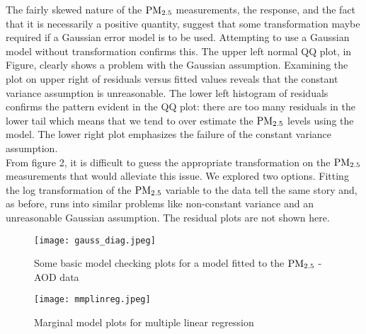 \documentclass[10pt]{article}
\begin{document}
\begin{itemize}
The fairly skewed nature of the ${\mathrm{PM_{2.5}}}$ measurements, the response, and the fact that it is necessarily a positive quantity, suggest that some transformation maybe required if a Gaussian error model is to be used. Attempting to use a Gaussian model without transformation confirms this. The upper left normal QQ plot, in Figure, clearly shows a problem with the Gaussian assumption. Examining the plot on upper right of residuals versus fitted values reveals that the constant variance assumption is unreasonable. The lower left histogram of residuals confirms the pattern evident in the QQ plot: there are too many residuals in the lower tail which means that we tend to over estimate the ${\mathrm{PM_{2.5}}}$ levels using the model. The lower right plot emphasizes the failure of the constant variance assumption. \\ From figure 2, it is difficult to guess the appropriate transformation on the ${\mathrm{PM_{2.5}}}$ measurements that would alleviate this issue. We explored two options. Fitting the log transformation of the ${\mathrm{PM_{2.5}}}$ variable to the data tell the same story and, as before, runs into similar problems like non-constant variance and an unreasonable Gaussian assumption. The residual plots are not shown here.

\begin{figure}[h]
\centering
\texttt{[image: gauss\_diag.jpeg]} 
\caption{Some basic model checking plots for a model fitted to the ${\mathrm{PM_{2.5}}}$ - AOD data} 
\end{figure}

\begin{figure}[h]
\centering 
\texttt{[image: mmplinreg.jpeg]}
\caption{Marginal model plots for multiple linear regression}
\end{figure}


\end{itemize}
\end{document}
